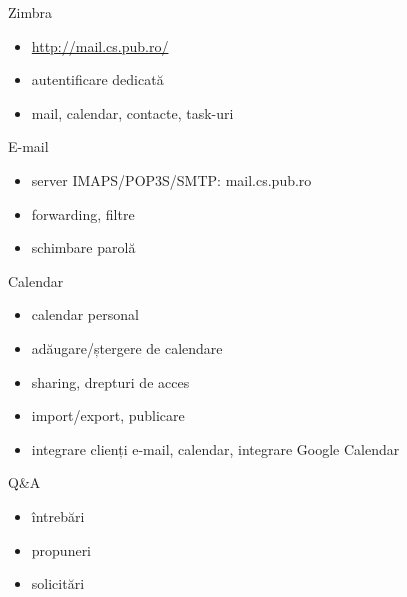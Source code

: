 \documentclass{beamer}
\begin{document}
\begin{frame}{Zimbra}
  \begin{itemize}
    \item \url{http://mail.cs.pub.ro/}
    \item autentificare dedicată
    \item mail, calendar, contacte, task-uri
  \end{itemize}
\end{frame}

\begin{frame}{E-mail}
  \begin{itemize}
    \item server IMAPS/POP3S/SMTP: mail.cs.pub.ro
    \item forwarding, filtre
    \item schimbare parolă
  \end{itemize}
\end{frame}

\begin{frame}{Calendar}
  \begin{itemize}
    \item calendar personal
    \item adăugare/ștergere de calendare
    \item sharing, drepturi de acces
    \item import/export, publicare
    \item integrare clienți e-mail, calendar, integrare Google Calendar
  \end{itemize}
\end{frame}

\begin{frame}{Q\&A}
  \begin{itemize}
    \item întrebări
    \item propuneri
    \item solicitări
  \end{itemize}
\end{frame}
\end{document}
